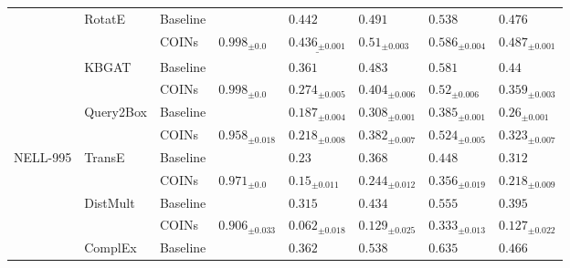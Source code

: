 \begin{table}[!ht]
\begin{adjustbox}{width=\textwidth}
\begin{tabular}{llllllll}
         & RotatE & Baseline &                          &                        ${{0.442}}$ &                        ${{0.491}}$ &                        ${{0.538}}$ &                        ${{0.476}}$ \\
         &           & COINs &    ${{0.998}_{\pm 0.0}}$ &  $\underline{{0.436}_{\pm 0.001}}$ &      $\mathbf{{0.51}_{\pm 0.003}}$ &     $\mathbf{{0.586}_{\pm 0.004}}$ &     $\mathbf{{0.487}_{\pm 0.001}}$ \\
         & KBGAT & Baseline &                          &                        ${{0.361}}$ &                        ${{0.483}}$ &                        ${{0.581}}$ &                         ${{0.44}}$ \\
         &           & COINs &    ${{0.998}_{\pm 0.0}}$ &            ${{0.274}_{\pm 0.005}}$ &            ${{0.404}_{\pm 0.006}}$ &             ${{0.52}_{\pm 0.006}}$ &            ${{0.359}_{\pm 0.003}}$ \\
         & Query2Box & Baseline &                          &            ${{0.187}_{\pm 0.004}}$ &            ${{0.308}_{\pm 0.001}}$ &            ${{0.385}_{\pm 0.001}}$ &             ${{0.26}_{\pm 0.001}}$ \\
         &           & COINs &  ${{0.958}_{\pm 0.018}}$ &     $\mathbf{{0.218}_{\pm 0.008}}$ &     $\mathbf{{0.382}_{\pm 0.007}}$ &     $\mathbf{{0.524}_{\pm 0.005}}$ &     $\mathbf{{0.323}_{\pm 0.007}}$ \\
\midrule
NELL-995 & TransE & Baseline &                          &                         ${{0.23}}$ &                        ${{0.368}}$ &                        ${{0.448}}$ &                        ${{0.312}}$ \\
         &           & COINs &    ${{0.971}_{\pm 0.0}}$ &             ${{0.15}_{\pm 0.011}}$ &            ${{0.244}_{\pm 0.012}}$ &            ${{0.356}_{\pm 0.019}}$ &            ${{0.218}_{\pm 0.009}}$ \\
         & DistMult & Baseline &                          &                        ${{0.315}}$ &                        ${{0.434}}$ &                        ${{0.555}}$ &                        ${{0.395}}$ \\
         &           & COINs &  ${{0.906}_{\pm 0.033}}$ &            ${{0.062}_{\pm 0.018}}$ &            ${{0.129}_{\pm 0.025}}$ &            ${{0.333}_{\pm 0.013}}$ &            ${{0.127}_{\pm 0.022}}$ \\
         & ComplEx & Baseline &                          &                        ${{0.362}}$ &                        ${{0.538}}$ &                        ${{0.635}}$ &                        ${{0.466}}$ \\

\end{tabular}
\end{adjustbox}
\end{table}

